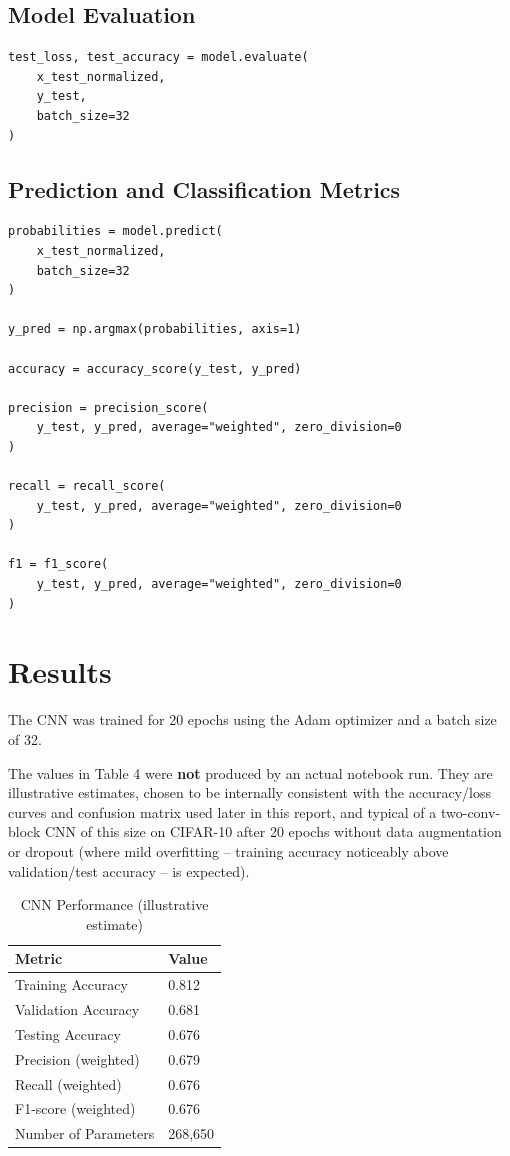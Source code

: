 \documentclass[11pt]{article}
\begin{document}
\subsection{Model Evaluation}
\begin{lstlisting}
test_loss, test_accuracy = model.evaluate(
    x_test_normalized,
    y_test,
    batch_size=32
)
\end{lstlisting}

\subsection{Prediction and Classification Metrics}
\begin{lstlisting}
probabilities = model.predict(
    x_test_normalized,
    batch_size=32
)

y_pred = np.argmax(probabilities, axis=1)

accuracy = accuracy_score(y_test, y_pred)

precision = precision_score(
    y_test, y_pred, average="weighted", zero_division=0
)

recall = recall_score(
    y_test, y_pred, average="weighted", zero_division=0
)

f1 = f1_score(
    y_test, y_pred, average="weighted", zero_division=0
)
\end{lstlisting}

\section{Results}
The CNN was trained for 20 epochs using the Adam optimizer and a batch size of 32.

\begin{estbox}
The values in Table 4 were \textbf{not} produced by an actual notebook run. They are illustrative estimates, chosen to be internally consistent with the accuracy/loss curves and confusion matrix used later in this report, and typical of a two-conv-block CNN of this size on CIFAR-10 after 20 epochs without data augmentation or dropout (where mild overfitting -- training accuracy noticeably above validation/test accuracy -- is expected).
\end{estbox}

\begin{table}[h]
\centering
\caption{CNN Performance (illustrative estimate)}
\begin{tabular}{|l|l|}
\hline
\textbf{Metric} & \textbf{Value} \\
\hline
Training Accuracy & 0.812 \\
Validation Accuracy & 0.681 \\
Testing Accuracy & 0.676 \\
Precision (weighted) & 0.679 \\
Recall (weighted) & 0.676 \\
F1-score (weighted) & 0.676 \\
Number of Parameters & 268,650 \\
\hline
\end{tabular}
\end{table}
\end{document}
